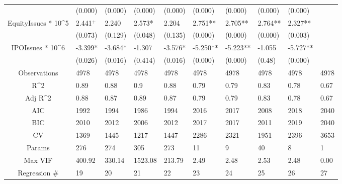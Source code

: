 \documentclass{article}
\begin{document}
\begin{table}[H]
\begin{tabular}{|clllllllll|}
   & (0.000) & (0.000) & (0.000) & (0.000) & (0.000) & (0.000) & (0.000) & (0.000) &  \\ 
  EquityIssues * 10^5 & 2.441$^{+}$ & 2.240 & 2.573* & 2.204 & 2.751** & 2.705** & 2.764** & 2.327** &  \\ 
   & (0.073) & (0.129) & (0.048) & (0.135) & (0.000) & (0.000) & (0.000) & (0.003) &  \\ 
  IPOIssues * 10^6 & -3.399* & -3.684* & -1.307 & -3.576* & -5.250** & -5.223** & -1.055 & -5.727** &  \\ 
   & (0.026) & (0.016) & (0.414) & (0.016) & (0.000) & (0.000) & (0.48) & (0.000) &  \\ 
  \hline 
 Observations & 4978 & 4978 & 4978 & 4978 & 4978 & 4978 & 4978 & 4978 & 4978 \\ 
  R^2 & 0.89 & 0.88 & 0.9 & 0.88 & 0.79 & 0.79 & 0.83 & 0.78 & 0.67 \\ 
  Adj R^2 & 0.88 & 0.87 & 0.89 & 0.87 & 0.79 & 0.79 & 0.83 & 0.78 & 0.67 \\ 
  AIC & 1992 & 1994 & 1986 & 1994 & 2016 & 2017 & 2008 & 2018 & 2040 \\ 
  BIC & 2010 & 2012 & 2006 & 2012 & 2017 & 2017 & 2011 & 2019 & 2040 \\ 
  CV & 1369 & 1445 & 1217 & 1447 & 2286 & 2321 & 1951 & 2396 & 3653 \\ 
  Params & 276 & 274 & 305 & 273 & 11 & 9 & 40 & 8 & 1 \\ 
  Max VIF & 400.92 & 330.14 & 1523.08 & 213.79 & 2.49 & 2.48 & 2.53 & 2.48 & 0.00 \\ 
  Regression \# & 19 & 20 & 21 & 22 & 23 & 24 & 25 & 26 & 27 \\ 
   \hline
\end{tabular}
 
\end{table}
\end{document}
